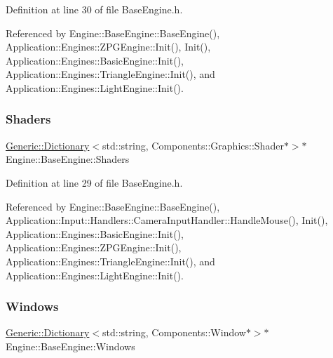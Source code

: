 Definition at line 30 of file Base\+Engine.\+h.



Referenced by Engine\+::\+Base\+Engine\+::\+Base\+Engine(), Application\+::\+Engines\+::\+Z\+P\+G\+Engine\+::\+Init(), Init(), Application\+::\+Engines\+::\+Basic\+Engine\+::\+Init(), Application\+::\+Engines\+::\+Triangle\+Engine\+::\+Init(), and Application\+::\+Engines\+::\+Light\+Engine\+::\+Init().

\mbox{\label{classEngine_1_1BaseEngine_a2582dee3f73da82bb422b43317b85e3b}} 
\subsubsection{\texorpdfstring{Shaders}{Shaders}}
{\footnotesize\ttfamily \mbox{\hyperlink{classGeneric_1_1Dictionary}{Generic\+::\+Dictionary}}$<$std\+::string, Components\+::\+Graphics\+::\+Shader$\ast$$>$$\ast$ Engine\+::\+Base\+Engine\+::\+Shaders\hspace{0.3cm}{\ttfamily [inherited]}}



Definition at line 29 of file Base\+Engine.\+h.



Referenced by Engine\+::\+Base\+Engine\+::\+Base\+Engine(), Application\+::\+Input\+::\+Handlers\+::\+Camera\+Input\+Handler\+::\+Handle\+Mouse(), Init(), Application\+::\+Engines\+::\+Basic\+Engine\+::\+Init(), Application\+::\+Engines\+::\+Z\+P\+G\+Engine\+::\+Init(), Application\+::\+Engines\+::\+Triangle\+Engine\+::\+Init(), and Application\+::\+Engines\+::\+Light\+Engine\+::\+Init().

\mbox{\label{classEngine_1_1BaseEngine_a4a1a4c4dae052e66ecc4f326eeed4d33}} 
\subsubsection{\texorpdfstring{Windows}{Windows}}
{\footnotesize\ttfamily \mbox{\hyperlink{classGeneric_1_1Dictionary}{Generic\+::\+Dictionary}}$<$std\+::string, Components\+::\+Window$\ast$$>$$\ast$ Engine\+::\+Base\+Engine\+::\+Windows\hspace{0.3cm}{\ttfamily [inherited]}}



